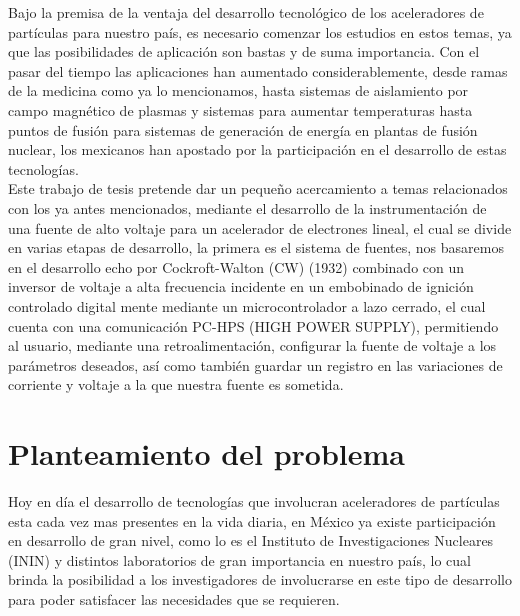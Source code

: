 Bajo la premisa de la ventaja del desarrollo tecnológico de los aceleradores de partículas para nuestro país, es necesario comenzar los estudios en estos temas, ya que las posibilidades de aplicación son bastas y de suma importancia. Con el pasar del tiempo las aplicaciones han aumentado considerablemente, desde ramas de la medicina como ya lo mencionamos, hasta sistemas de aislamiento por campo magnético de plasmas y sistemas para aumentar temperaturas hasta puntos de fusión para sistemas de generación de energía en plantas de fusión nuclear, los mexicanos han apostado por la participación en el desarrollo de estas tecnologías.\\

Este trabajo de tesis pretende dar un pequeño acercamiento a temas relacionados con los ya antes mencionados, mediante el desarrollo de la instrumentación de una fuente de alto voltaje para un acelerador de electrones lineal, el cual se divide en varias etapas de desarrollo, la primera es el sistema de fuentes, nos basaremos en el desarrollo echo por Cockroft-Walton (CW) (1932) combinado con un inversor de voltaje a alta frecuencia incidente en un embobinado de ignición controlado digital mente mediante un microcontrolador a lazo cerrado, el cual cuenta con una comunicación PC-HPS (HIGH POWER SUPPLY), permitiendo al usuario, mediante una retroalimentación, configurar la fuente de voltaje a los parámetros deseados, así como también guardar un registro en las variaciones de corriente y voltaje a la que nuestra fuente es sometida. \\
\newpage



\section{Planteamiento del problema}
Hoy en día el desarrollo de tecnologías que involucran aceleradores de partículas esta cada vez mas presentes en la vida diaria, en México ya existe participación en desarrollo de gran nivel, como lo es el Instituto de Investigaciones Nucleares (ININ) y distintos laboratorios de gran importancia en nuestro país, lo cual brinda la posibilidad a los investigadores de involucrarse en este tipo de desarrollo para poder satisfacer las necesidades
que se requieren.\\

